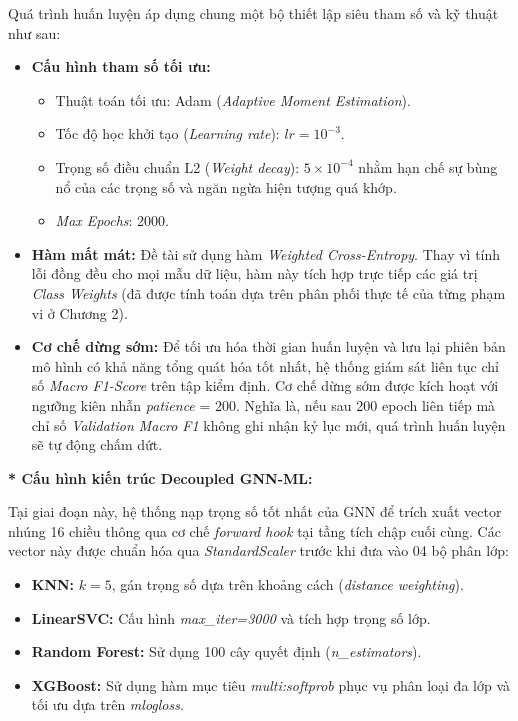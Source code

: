 Quá trình huấn luyện áp dụng chung một bộ thiết lập siêu tham số và kỹ thuật như sau:
\begin{itemize}[label={--}, itemsep=1pt]
    \item \textbf{Cấu hình tham số tối ưu:} 
    \begin{itemize}[label={+}, itemsep=1pt]
        \item Thuật toán tối ưu: Adam (\textit{Adaptive Moment Estimation}).
        \item Tốc độ học khởi tạo (\textit{Learning rate}): $lr = 10^{-3}$.
        \item Trọng số điều chuẩn L2 (\textit{Weight decay}): $5 \times 10^{-4}$ nhằm hạn chế sự bùng nổ của các trọng số và ngăn ngừa hiện tượng quá khớp.
        \item \textit{Max Epochs}: 2000.
    \end{itemize}
    
    \item \textbf{Hàm mất mát:} Đề tài sử dụng hàm \textit{Weighted Cross-Entropy}. Thay vì tính lỗi đồng đều cho mọi mẫu dữ liệu, hàm này tích hợp trực tiếp các giá trị \textit{Class Weights} (đã được tính toán dựa trên phân phối thực tế của từng phạm vi ở Chương 2).
    
    \item \textbf{Cơ chế dừng sớm:} Để tối ưu hóa thời gian huấn luyện và lưu lại phiên bản mô hình có khả năng tổng quát hóa tốt nhất, hệ thống giám sát liên tục chỉ số \textit{Macro F1-Score} trên tập kiểm định. Cơ chế dừng sớm được kích hoạt với ngưỡng kiên nhẫn \textit{patience} = 200. Nghĩa là, nếu sau 200 epoch liên tiếp mà chỉ số \textit{Validation Macro F1} không ghi nhận kỷ lục mới, quá trình huấn luyện sẽ tự động chấm dứt.
\end{itemize}

\textbf{* Cấu hình kiến trúc Decoupled GNN-ML:}\vspace{0.2cm}

Tại giai đoạn này, hệ thống nạp trọng số tốt nhất của GNN để trích xuất vector nhúng 16 chiều thông qua cơ chế \textit{forward hook} tại tầng tích chập cuối cùng. Các vector này được chuẩn hóa qua \textit{StandardScaler} trước khi đưa vào 04 bộ phân lớp:
\begin{itemize}[label={--}, itemsep=1pt]
    \item \textbf{KNN:} $k=5$, gán trọng số dựa trên khoảng cách (\textit{distance weighting}).
    \item \textbf{LinearSVC:} Cấu hình \textit{max\_iter=3000} và tích hợp trọng số lớp.
    \item \textbf{Random Forest:} Sử dụng 100 cây quyết định (\textit{n\_estimators}).
    \item \textbf{XGBoost:} Sử dụng hàm mục tiêu \textit{multi:softprob} phục vụ phân loại đa lớp và tối ưu dựa trên \textit{mlogloss}.
\end{itemize}

